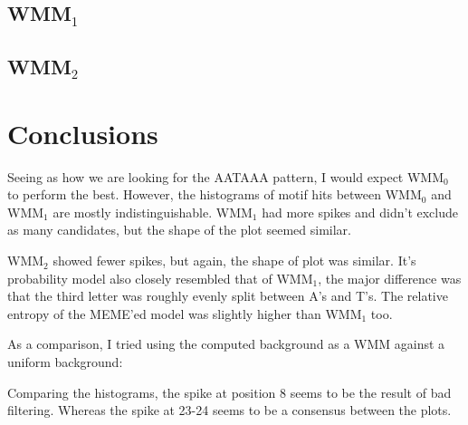 \documentclass[a4paper, 12pt]{report}
\begin{document}
    \subsection{WMM$_1$}
        
        

    \subsection{WMM$_2$}
        
        

\section{Conclusions}
    Seeing as how we are looking for the AATAAA pattern, 
        I would expect WMM$_0$ to perform the best.
    However, the histograms of motif hits between WMM$_0$ and WMM$_1$ are mostly indistinguishable.  
    WMM$_1$ had more spikes and didn't exclude as many candidates, but the shape of the plot seemed similar.
    
    WMM$_2$ showed fewer spikes, but again, the shape of plot was similar.  
    It's probability model also closely resembled that of WMM$_1$, 
        the major difference was that the third letter was roughly evenly split between A's and T's.
    The relative entropy of the MEME'ed model was slightly higher than WMM$_1$ too.   
    
    As a comparison, I tried using the computed background as a WMM against a uniform background: \\
    
    Comparing the histograms, the spike at position 8 seems to be the result of bad filtering.
    Whereas the spike at 23-24 seems to be a consensus between the plots.  
\end{document}
